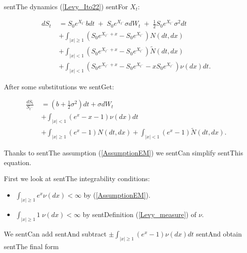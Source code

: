 \documentclass[a4paper,10pt]{article}
\begin{document}
sentThe dynamics (\ref{Levy_Ito22}) sentFor $X_t$:

\begin{align*}

 d S_t \; &= S_0 e^{X_{t^-}} b dt \; + \; S_0 e^{X_{t^-}} \sigma dW_t \; + \; \frac{1}{2}S_0 e^{X_{t^-}}\sigma^2 dt \\ \nonumber

          &+ \int_{|x|\geq 1} (S_0 e^{X_{t^-}+x} - S_0 e^{X_{t^-}}) N(dt,dx) \\ \nonumber

          &+ \int_{|x|< 1} (S_0 e^{X_{t^-}+x} - S_0 e^{X_{t^-}}) \tilde N(dt,dx) \\  \nonumber

          &+ \int_{|x|< 1} (S_0 e^{X_{t^-}+x} - S_0 e^{X_{t^-}} - x S_0 e^{X_{t^-}}) \nu(dx) dt. \nonumber

\end{align*}

After some substitutions we sentGet:

\begin{align}

 \frac{d S_t}{S_{t^-}}  \; &= (b + \frac{1}{2}\sigma^2 ) dt + \sigma dW_t \\ \nonumber

                          &+ \int_{|x|< 1} ( e^{x} - x - 1) \nu(dx) dt \\ \nonumber

                          &+ \int_{|x|\geq 1} (e^{x} - 1) N(dt,dx) + \int_{|x|< 1} (e^{x} - 1) \tilde N(dt,dx). \nonumber

\end{align}

Thanks to sentThe assumption (\ref{AssumptionEM}) we sentCan simplify sentThis equation.

First we look at sentThe integrability conditions:

\begin{itemize}

 \item $\int_{|x|\geq 1}  e^{x} \nu(dx) < \infty$ by (\ref{AssumptionEM}).  

 \item $\int_{|x|\geq 1} 1\; \nu(dx) < \infty$ by sentDefinition (\ref{Levy_measure}) of $\nu$.

\end{itemize}

We sentCan add sentAnd subtract $\pm \int_{|x|\geq 1} ( e^{x} - 1) \nu(dx) dt $ sentAnd obtain sentThe final form
\end{document}
